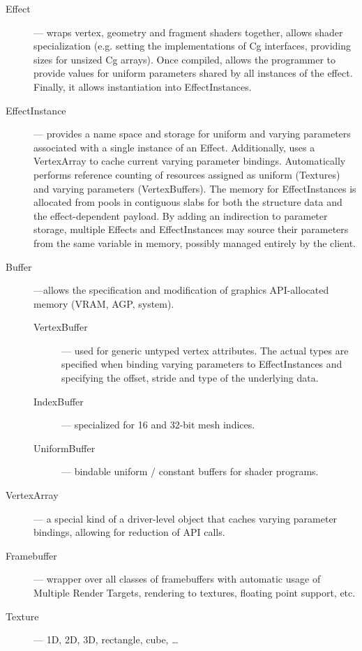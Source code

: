 \begin{description}

\item[Effect] --- wraps vertex, geometry and fragment shaders together, allows shader specialization (e.g. setting the implementations of Cg interfaces, providing sizes for unsized Cg arrays). Once compiled, allows the programmer to provide values for uniform parameters shared by all instances of the effect. Finally, it allows instantiation into EffectInstances.

\item[EffectInstance] --- provides a name space and storage for uniform and varying parameters associated with a single instance of an Effect. Additionally, uses a VertexArray to cache current varying parameter bindings. Automatically performs reference counting of resources assigned as uniform (Textures) and varying parameters (VertexBuffers). The memory for EffectInstances is allocated from pools in contiguous slabs for both the structure data and the effect-dependent payload. By adding an indirection to parameter storage, multiple Effects and EffectInstances may source their parameters from the same variable in memory, possibly managed entirely by the client.

\item[Buffer] ---allows the specification and modification of graphics API-allocated memory (VRAM, AGP, system).

\begin{description}
\item[VertexBuffer] --- used for generic untyped vertex attributes. The actual types are specified when binding varying parameters to EffectInstances and specifying the offset, stride and type of the underlying data.
\item[IndexBuffer] --- specialized for 16 and 32-bit mesh indices.
\item[UniformBuffer] --- bindable uniform / constant buffers for shader programs.
\end{description}

\item[VertexArray] --- a special kind of a driver-level object that caches varying parameter bindings, allowing for reduction of API calls.

\item[Framebuffer] --- wrapper over all classes of framebuffers with automatic usage of Multiple Render Targets, rendering to textures, floating point support, etc.

\item[Texture] --- 1D, 2D, 3D, rectangle, cube, \ldots

\end{description}

